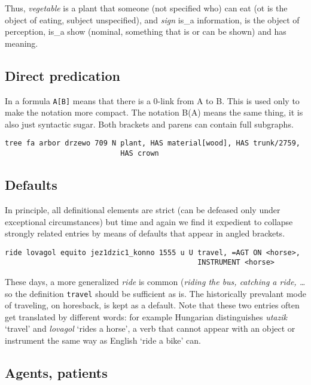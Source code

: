 \documentclass[11pt,bookmarks,bookmarksnumbered,naturalnames,plainpages=false,pdftex,colorlinks=true,urlcolor=blue,bookmarksdepth=subsection,plainpages=false]{paper}
\begin{document}
\noindent
Thus, {\it vegetable} is a plant that someone (not specified who) can eat (ot
is the object of eating, subject unspecified), and {\it sign} is\_a
information, is the object of perception, is\_a show (nominal, something that
is or can be shown) and has meaning.

\subsection{Direct predication}\label{isa}

In a formula {\tt A[B]} means that there is a 0-link from A to B. This is used
only to make the notation more compact. The notation B(A) means the same
thing, it is also just syntactic sugar. Both brackets and parens can contain
full subgraphs. 

\begin{verbatim}
tree fa arbor drzewo 709 N plant, HAS material[wood], HAS trunk/2759, 
                           HAS crown 
\end{verbatim}

\subsection{Defaults}\label{default}

In principle, all definitional elements are strict (can be defeased only under
exceptional circumstances) but time and again we find it expedient to collapse 
strongly related entries by means of defaults that appear in angled brackets. 

\begin{verbatim}
ride lovagol equito jez1dzic1_konno 1555 u U travel, =AGT ON <horse>, 
                                             INSTRUMENT <horse>
\end{verbatim}

These days, a more generalized {\it ride} is common ({\it riding the bus,
  catching a ride, \ldots} so the definition {\tt travel} should be sufficient
as is. The historically prevalant mode of traveling, on horesback, is kept as
a default. Note that these two entries often get translated by different
words: for example Hungarian distinguishes {\it utazik} `travel' and {\it
  lovagol} `rides a horse', a verb that cannot appear with an object or
instrument the same way as English `ride a bike' can.  

\subsection{Agents, patients}\label{agtpat}
\end{document}

